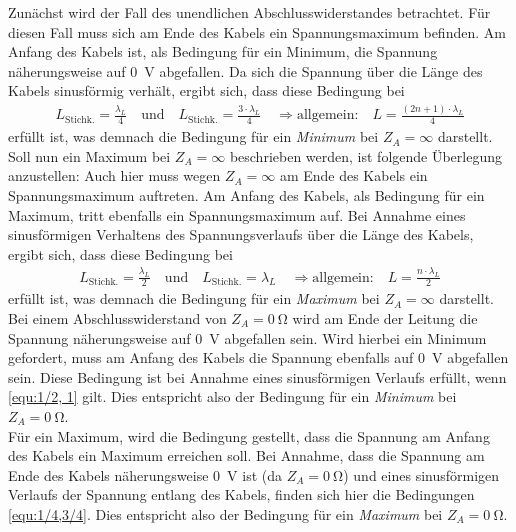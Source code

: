 \documentclass[a4paper,twoside,final]{article}
\begin{document}
Zunächst wird der Fall des unendlichen Abschlusswiderstandes betrachtet. Für diesen Fall muss sich am Ende des Kabels ein Spannungsmaximum befinden. Am Anfang des Kabels ist, als Bedingung für ein Minimum, die Spannung näherungsweise auf \SI{0}{\volt} abgefallen. Da sich die Spannung über die Länge des Kabels sinusförmig verhält, ergibt sich, dass diese Bedingung bei
\begin{align}\label{equ:1/4,3/4}
  L_{\text{Stichk.}} = \frac{\lambda_{L}}{4} \quad \text{und} \quad L_{\text{Stichk.}} = \frac{3\cdot \lambda_{L}}{4}  \quad \Rightarrow \text{allgemein:}\quad L = \frac{(2n+1)\cdot \lambda_{L}}{4}
\end{align}
erfüllt ist, was demnach die Bedingung für ein \textit{Minimum} bei $Z_A = \infty$ darstellt.\\
Soll nun ein Maximum bei $Z_A = \infty$ beschrieben werden, ist folgende Überlegung anzustellen: Auch hier muss wegen $Z_A=\infty$ am Ende des Kabels ein Spannungsmaximum auftreten. Am Anfang des Kabels, als Bedingung für ein Maximum, tritt ebenfalls ein Spannungsmaximum auf. Bei Annahme eines sinusförmigen Verhaltens des Spannungsverlaufs über die Länge des Kabels, ergibt sich, dass diese Bedingung bei
\begin{align}\label{equ:1/2, 1}
L_{\text{Stichk.}} = \frac{\lambda_{L}}{2} \quad \text{und} \quad L_{\text{Stichk.}} = \lambda_{L} \quad \Rightarrow \text{allgemein:}\quad L = \frac{n \cdot \lambda_{L}}{2}
\end{align}
erfüllt ist, was demnach die Bedingung für ein \textit{Maximum} bei $Z_A = \infty$ darstellt.\\
Bei einem Abschlusswiderstand von $Z_A = \SI{0}{\ohm}$ wird am Ende der Leitung die Spannung näherungsweise auf \SI{0}{\volt} abgefallen sein. Wird hierbei ein Minimum gefordert, muss am Anfang des Kabels die Spannung ebenfalls auf \SI{0}{\volt} abgefallen sein. Diese Bedingung ist bei Annahme eines sinusförmigen Verlaufs erfüllt, wenn \eqref{equ:1/2, 1} gilt. Dies entspricht also der Bedingung für ein \textit{Minimum} bei $Z_A = \SI{0}{\ohm}$.\\
Für ein Maximum, wird die Bedingung gestellt, dass die Spannung am Anfang des Kabels ein Maximum erreichen soll. Bei Annahme, dass die Spannung am Ende des Kabels näherungsweise \SI{0}{\volt} ist (da $Z_A = \SI{0}{\ohm}$) und eines sinusförmigen Verlaufs der Spannung entlang des Kabels, finden sich hier die Bedingungen \eqref{equ:1/4,3/4}.
Dies entspricht also der Bedingung für ein \textit{Maximum} bei $Z_A = \SI{0}{\ohm}$.\\
\end{document}
